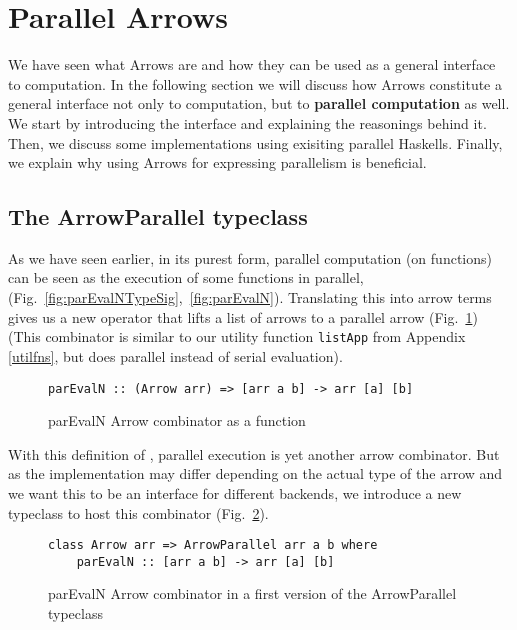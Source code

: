 \section{Parallel Arrows}
\label{sec:parallel-arrows}
We have seen what Arrows are and how they can be used as a general interface to computation. In the following section we will discuss how Arrows constitute a general interface not only to computation, but to \textbf{parallel computation} as well. We start by introducing the interface and explaining the reasonings behind it. Then, we discuss some implementations using exisiting parallel Haskells. Finally, we explain why using Arrows for expressing parallelism is beneficial.
\subsection{The ArrowParallel typeclass}
As we have seen earlier, in its purest form, parallel computation (on functions) can be seen as the execution of some functions  in parallel,  (Fig.~\ref{fig:parEvalNTypeSig},~\ref{fig:parEvalN}).
Translating this into arrow terms gives us a new operator  that lifts a list of arrows \inlinecode{[arr a b]} to a parallel arrow  (Fig.~\ref{fig:parEvalNArrowFn}) (This combinator is similar to our utility function \lstinline{listApp} from Appendix \ref{utilfns}, but does parallel instead of serial evaluation).
\begin{figure}[h]
\begin{lstlisting}[frame=htrbl]
parEvalN :: (Arrow arr) => [arr a b] -> arr [a] [b]
\end{lstlisting}
\caption{parEvalN Arrow combinator as a function}
\label{fig:parEvalNArrowFn}
\end{figure}
With this definition of , parallel execution is yet another arrow combinator. But as the implementation may differ depending on the actual type of the arrow  and we want this to be an interface for different backends, we introduce a new typeclass  to host this combinator (Fig.~\ref{fig:parEvalNArrowTypeClass1}).
\begin{figure}[h]
\begin{lstlisting}[frame=htrbl]
class Arrow arr => ArrowParallel arr a b where
	parEvalN :: [arr a b] -> arr [a] [b]
\end{lstlisting}
\caption{parEvalN Arrow combinator in a first version of the ArrowParallel typeclass}
\label{fig:parEvalNArrowTypeClass1}
\end{figure}
